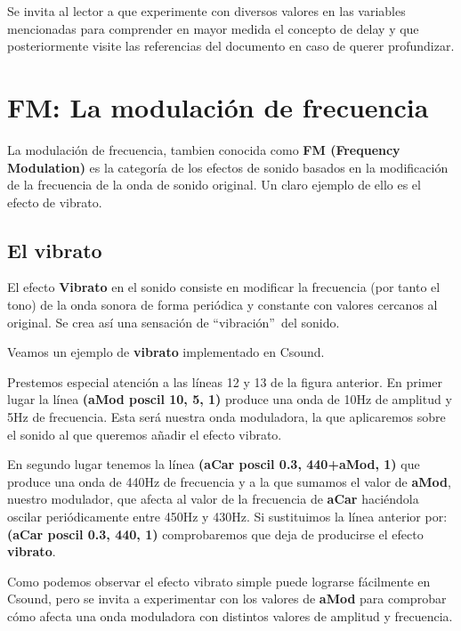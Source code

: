 
Se invita al lector a que experimente con diversos valores en las variables mencionadas para comprender en mayor medida el concepto de delay y que posteriormente visite las referencias del documento en caso de querer profundizar.
\pagebreak

\section{FM: La modulación de frecuencia}

La modulación de frecuencia, tambien conocida como \textbf{FM (Frequency Modulation)} es la categoría de los efectos de sonido basados en la modificación de la frecuencia de la onda de sonido original. Un claro ejemplo de ello es el efecto de vibrato.

\subsection{El vibrato}

El efecto \textbf{Vibrato} en el sonido consiste en modificar la frecuencia (por tanto el tono) de la onda sonora de forma periódica y constante  con valores cercanos al original. Se crea así una sensación de ``vibración''\ del sonido. 

Veamos un ejemplo de \textbf{vibrato} implementado en Csound.

Prestemos especial atención a las líneas 12 y 13 de la figura anterior. En primer lugar la línea \textbf{(aMod poscil 10, 5, 1)} produce una onda de 10Hz de amplitud y 5Hz de frecuencia. Esta será nuestra onda moduladora, la que aplicaremos sobre el sonido al que queremos añadir el efecto vibrato.

En segundo lugar tenemos la línea \textbf{(aCar poscil 0.3, 440+aMod, 1)} que produce una onda de 440Hz de frecuencia y a la que sumamos el valor de \textbf{aMod}, nuestro modulador, que afecta al valor de la frecuencia de \textbf{aCar} haciéndola oscilar periódicamente entre 450Hz y 430Hz.
Si sustituimos la línea anterior por: \textbf{(aCar poscil 0.3, 440, 1)} comprobaremos que deja de producirse el efecto \textbf{vibrato}.

Como podemos observar el efecto vibrato simple puede lograrse fácilmente en Csound, pero se invita a  experimentar con los valores de \textbf{aMod} para comprobar cómo afecta una onda moduladora con distintos valores de amplitud y frecuencia.
\pagebreak

